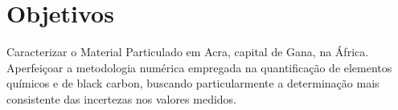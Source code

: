 \section{Objetivos}

Caracterizar o Material Particulado em Acra, capital de Gana, na África.
Aperfeiçoar a metodologia numérica empregada na quantificação de elementos químicos e de black carbon, buscando particularmente a determinação mais consistente das incertezas nos valores medidos.